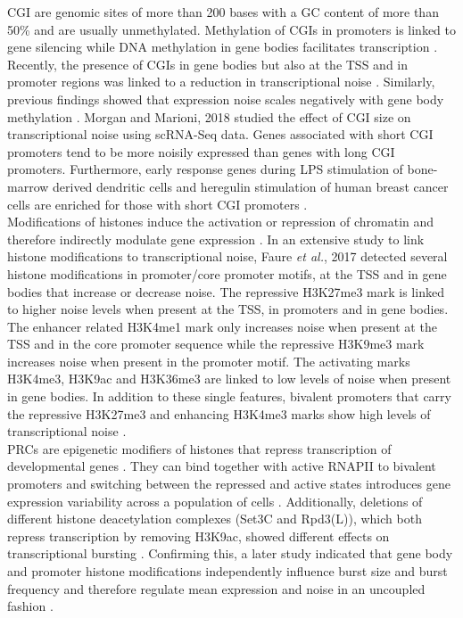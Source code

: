 \Gls{CGI} are genomic sites of more than 200 bases with a GC content of more than 50\% and are usually unmethylated. Methylation of CGIs in promoters is linked to gene silencing while DNA methylation in gene bodies facilitates transcription \citep{Portela2010}.  Recently, the presence of CGIs in gene bodies but also at the TSS and in promoter regions was linked to a reduction in transcriptional noise \citep{Faure2017}. Similarly, previous findings showed that expression noise scales negatively with gene body methylation \cite{Huh2013}. Morgan and Marioni, 2018 studied the effect of CGI size on transcriptional noise using scRNA-Seq data. Genes associated with short CGI promoters tend to be more noisily expressed than genes with long CGI promoters. Furthermore, early response genes during \gls{LPS} stimulation of bone-marrow derived dendritic cells and heregulin stimulation of human breast cancer cells are enriched for those with short CGI promoters \citep{Morgan2018}. \\

Modifications of histones induce the activation or repression of chromatin and  therefore indirectly modulate gene expression \citep{Suganuma2011}. In an extensive study to link histone modifications to transcriptional noise, Faure \textit{et al.}, 2017 detected several histone modifications in promoter/core promoter motifs, at the TSS and in gene bodies that increase or decrease noise. The repressive \gls{H3K27me3} mark is linked to higher noise levels when present at the TSS, in promoters and in gene bodies. The enhancer related \gls{H3K4me1} mark only increases noise when present at the TSS and in the core promoter sequence while the repressive \gls{H3K9me3} mark increases noise when present in the promoter motif. The activating marks \gls{H3K4me3}, \gls{H3K9ac} and \gls{H3K36me3} are linked to low levels of noise when present in gene bodies. In addition to these single features, bivalent promoters that carry the repressive \gls{H3K27me3} and enhancing \gls{H3K4me3} marks show high levels of transcriptional noise \citep{Faure2017}.\\ 

\Glspl{PRC} are epigenetic modifiers of histones that repress transcription of developmental genes \citep{Chittock2017}. They can bind together with active \gls{RNAPII} to bivalent promoters and switching between the repressed and active states introduces gene expression variability across a population of cells \cite{Kar2017}. Additionally, deletions of different histone deacetylation complexes (Set3C and Rpd3(L)), which both repress transcription by removing H3K9ac, showed different effects on transcriptional bursting \citep{Weinberger2012}.  Confirming this, a later study indicated that gene body and promoter histone modifications independently influence burst size and burst frequency and therefore regulate mean expression and noise in an uncoupled fashion \cite{Wu2017}. \\

